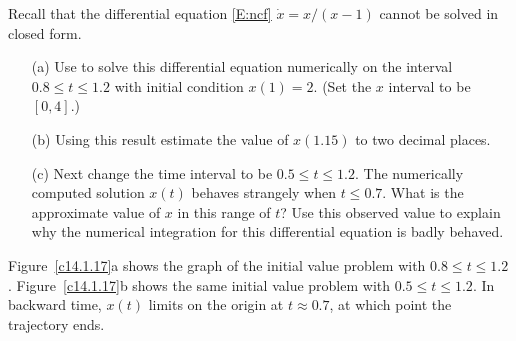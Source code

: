 \documentclass{ximera}
\begin{document}
\begin{exercise} \label{c14.1.17}
Recall that the differential equation \eqref{E:ncf} $\dot{x}=x/(x-1)$ cannot be 
solved in closed form.  
\begin{itemize}
\item[(a)]	Use {\dfield} 
to solve this differential 
equation numerically on the interval $0.8\leq t\leq 1.2$ with initial 
condition $x(1)=2$.  (Set the $x$ interval to be $[0,4]$.)  
\item[(b)]	Using this result estimate the value of $x(1.15)$ to two 
decimal places.
\item[(c)]	Next change the time interval to be $0.5\leq t\leq 1.2$.
The numerically computed solution $x(t)$ behaves strangely when $t\leq 0.7$. 
What is the approximate value of $x$ in this range of $t$?  Use this 
observed value to explain why the numerical integration for this differential 
equation is badly behaved.
\end{itemize}

\begin{solution}
Figure~\ref{c14.1.17}a shows the graph of the initial
value problem with $0.8 \leq t \leq 1.2$.  Figure~\ref{c14.1.17}b shows
the same initial value problem with $0.5 \leq t \leq 1.2$.  In
backward time, $x(t)$ limits on the origin at $t \approx 0.7$, at
which point the trajectory ends.

\begin{figure}[htb]
                       \centerline{%
                       }
\end{figure}

\end{solution}
\end{exercise}
\end{document}
